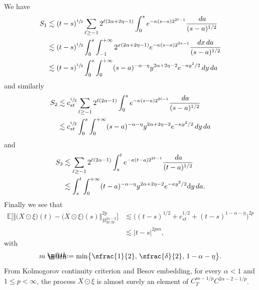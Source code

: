 \documentclass[JEP,XML,SOM,Unicode,published]{cedram}
\makeatletter
\theoremstyle{definition}
\newcommand\bbE{\mathbb{E}}
\newcommand*{\defeq}{\mathrel{\rlap{%
\raisebox{0.3ex}{$\m@th\cdot$}}%
\raisebox{-0.3ex}{$\m@th\cdot$}}%
=}
\newcommand{\dd}{\textup{d}}
\makeatother
\begin{document}
We have
\begin{align*}
S_1&\lesssim (t-s)^{\sfrac{1}{2}}\sum_{\ell\geq -1} 2^{\ell(2\alpha+2\eta-1)} \int_0^s e^{-\kappa(s-a)2^{2\ell-1}}\frac{\,da}{(s-a)^{1/2}}
\\
&\lesssim (t-s)^{\sfrac{1}{2}}\int_0^s \int_{-1}^{+\infty} 2^{x(2\alpha+2\eta-1)}e^{-\kappa(s-a)2^{2x-1}}\frac{dx\,da}{(s-a)^{1/2}}
\\
&\lesssim (t-s)^{\sfrac{1}{2}} \int_0^s \int_0^{+\infty} (s-a)^{-\alpha-\eta} y^{2\alpha+2\eta-2}e^{-\kappa y^2/2} \,dy\,da
\end{align*}
and similarly
\begin{align*}
S_2&\lesssim c_{st}^{\sfrac{1}{2}}\sum_{\ell\geq -1} 2^{\ell(2\alpha-1)} \int_0^s e^{-\kappa(s-a)2^{2\ell-1}}\frac{\,da}{(s-a)^{1/2}}
\\
&\lesssim c_{st}^{\sfrac{1}{2}} \int_0^s \int_0^{+\infty} (s-a)^{-\alpha-\eta} y^{2\alpha+2\eta-2}e^{-\kappa y^2/2} \,dy\,da
\end{align*}
and
\begin{align*}
S_3&\lesssim \sum_{\ell\geq -1} 2^{\ell(2\alpha-1)} \int_s^t e^{-\kappa(t-a)2^{2\ell-1}}\frac{\,da}{(t-a)^{1/2}}
\\
&\lesssim \int_s^t \int_0^{+\infty} (t-a)^{-\alpha-\eta} y^{2\alpha+2\eta-2}e^{-\kappa y^2/2} \dd y\,da.
\end{align*}
Finally we see that
\begin{align*}
\bbE\bigl[\big\Vert\bigl(X\odot\xi\bigr)(t)-\bigl(X\odot\xi\bigr)(s)\big\Vert_{B^{2\alpha-2}_{2p,2p}}^{2p}\bigr]&\lesssim \bigl( (t-s)^{1/2}+c_{st}^{1/2}+(t-s)^{1-\alpha-\eta}\bigr)^{2p}
\\
&\lesssim |t-s|^{2pm},
\end{align*}
with
\[
m\defeq \min\bigl\{ \sfrac{1}{2}, \, \sfrac{\delta}{2},\, 1-\alpha-\eta\bigr\}.
\]
From Kolmogorov continuity criterion and Besov embedding, for every $\alpha<1$ and $1\leq p<\infty$, the process $X\odot\xi$ is almost surely an element of $C^{m-1/p}_TC^{2\alpha-2 - 1/p}$.
\end{document}
